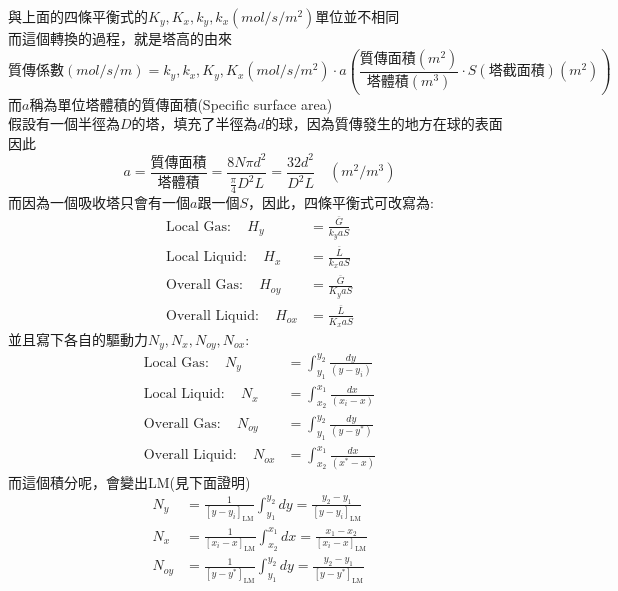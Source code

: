 \documentclass[../main.tex]{subfiles}
\begin{document}
\begin{itemize}
  與上面的四條平衡式的$K_y,K_x,k_y,k_x (mol/s/m^2)$單位並不相同\\
  而這個轉換的過程，就是塔高的由來
  \begin{equation}
    \text{質傳係數} (mol/s/m) = k_y,k_x,K_y,K_x (mol/s/m^2)\cdot a\left(
      \frac{\text{質傳面積}(m^2)}{\text{塔體積}(m^3)}\cdot S (\text{塔截面積})(m^2)
    \right)
  \end{equation}
  而$a$稱為單位塔體積的質傳面積(Specific surface area)\\
  假設有一個半徑為$D$的塔，填充了半徑為$d$的球，因為質傳發生的地方在球的表面\\
  因此
  \begin{equation}
    a =\frac{\text{質傳面積}}{\text{塔體積}}= \frac{8N \pi d^2}{\frac{\pi}{4}D^2L}
    = \frac{32d^2}{D^2L} \quad (m^2/m^3)
  \end{equation}
  而因為一個吸收塔只會有一個$a$跟一個$S$，因此，四條平衡式可改寫為:
  \begin{align}
    \text{Local Gas}: \quad H_y &= \frac{\overline{G}}{k_y a S} \\
    \text{Local Liquid}: \quad H_x &= \frac{\overline{L}}{k_x a S} \\
    \text{Overall Gas}: \quad H_{oy} &= \frac{\overline{G}}{K_y a S} \\
    \text{Overall Liquid}: \quad H_{ox} &= \frac{\overline{L}}{K_x a S}
  \end{align}
  並且寫下各自的驅動力$N_y, N_x, N_{oy}, N_{ox}$:
  \begin{align}
    \text{Local Gas}: \quad N_y &= \int_{y_1}^{y_2} \frac{dy}{(y - y_i)} \\
    \text{Local Liquid}: \quad N_x &= \int_{x_2}^{x_1} \frac{dx}{(x_i - x)} \\
    \text{Overall Gas}: \quad N_{oy} &= \int_{y_1}^{y_2} \frac{dy}{(y - y^\ast)}\\
    \text{Overall Liquid}: \quad N_{ox} &= \int_{x_2}^{x_1} \frac{dx}{(x^\ast - x)}
  \end{align}
  而這個積分呢，會變出LM(見下面證明)
  \begin{align}
    N_y  &= \frac{1}{[y-y_i]_{\text{LM}}}\int_{y_1}^{y_2} dy = \frac{y_2 - y_1}{[y-y_i]_{\text{LM}}}\\
    N_x  &= \frac{1}{[x_i - x]_{\text{LM}}}\int_{x_2}^{x_1} dx = \frac{x_1 - x_2}{[x_i - x]_{\text{LM}}}\\
    N_{oy}  &= \frac{1}{[y - y^\ast]_{\text{LM}}}\int_{y_1}^{y_2} dy = \frac{y_2 - y_1}{[y - y^\ast]_{\text{LM}}}\\

\end{align}
\end{itemize}
\end{document}
